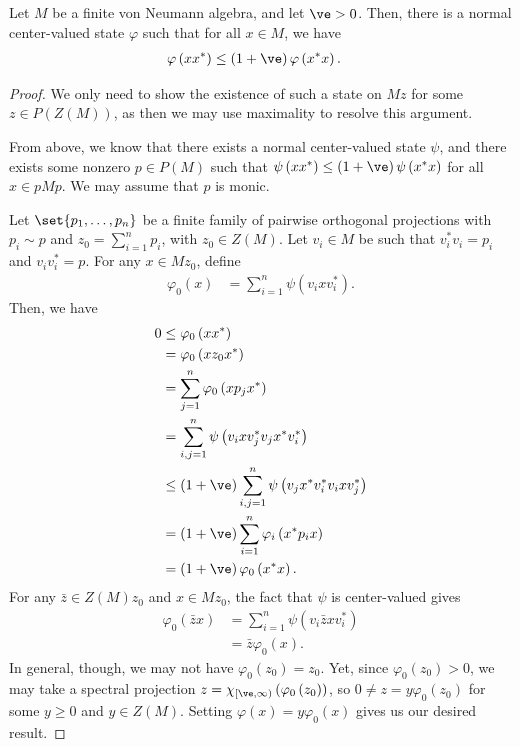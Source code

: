 \documentclass[10pt]{mypackage}
\begin{document}
\begin{lemma}
  Let $M$ be a finite von Neumann algebra, and let $\ve > 0$. Then, there is a normal center-valued state $\varphi$ such that for all $x\in M$, we have
  \begin{align*}
    \varphi\left( xx^{\ast} \right) &\leq \left( 1+\ve \right)\varphi\left( x^{\ast}x \right).
  \end{align*}
\end{lemma}
\begin{proof}
  We only need to show the existence of such a state on $Mz$ for some $z\in P(Z(M))$, as then we may use maximality to resolve this argument.

  From above, we know that there exists a normal center-valued state $\psi$, and there exists some nonzero $p\in P(M)$ such that $\psi\left( xx^{\ast} \right)\leq \left( 1+\ve \right)\psi\left( x^{\ast}x \right)$ for all $x\in pMp$. We may assume that $p$ is monic.

  Let $\set{p_1,\dots,p_n}$ be a finite family of pairwise orthogonal projections with $p_i\sim p$ and $z_0 = \sum_{i=1}^{n}p_i$, with $z_0\in Z(M)$. Let $v_i\in M$ be such that $v_i^{\ast}v_i = p_i$ and $v_iv_i^{\ast} = p$. For any $x\in Mz_0$, define
  \begin{align*}
    \varphi_0(x) &= \sum_{i=1}^{n}\psi\left( v_ixv_i^{\ast} \right).
  \end{align*}
  Then, we have
  \begin{align*}
    0 &\leq \varphi_0\left( xx^{\ast} \right)\\
      &= \varphi_0\left( xz_0x^{\ast} \right)\\
      &= \sum_{j=1}^{n} \varphi_0\left( xp_jx^{\ast} \right)\\
      &= \sum_{i,j=1}^{n} \psi\left( v_ixv_j^{\ast}v_jx^{\ast}v_i^{\ast} \right)\\
      &\leq \left( 1+\ve \right) \sum_{i,j=1}^{n}\psi\left( v_jx^{\ast}v_i^{\ast}v_ixv_j^{\ast} \right)\\
      &= \left( 1+\ve \right)\sum_{i=1}^{n} \varphi_i\left( x^{\ast}p_ix \right)\\
      &= \left( 1+\ve \right)\varphi_0\left( x^{\ast}x \right).
  \end{align*}
  For any $ \bar{z}\in Z(M)z_0 $ and $x\in Mz_0$, the fact that $\psi$ is center-valued gives
  \begin{align*}
    \varphi_0\left( \bar{z}x \right) &= \sum_{i=1}^{n}\psi\left( v_i\bar{z}xv_i^{\ast} \right)\\
                                     &= \bar{z} \varphi_0\left( x \right).
  \end{align*}
  In general, though, we may not have $\varphi_0\left( z_0 \right) = z_0$. Yet, since $\varphi_0\left( z_0 \right) > 0$, we may take a spectral projection $z = \chi_{[\ve,\infty)}\left( \varphi_0\left( z_0 \right) \right)$, so $0 \neq z = y\varphi_0\left( z_0 \right)$ for some $y\geq 0$ and $y\in Z(M)$. Setting $\varphi(x) = y\varphi_0(x)$ gives us our desired result.
\end{proof}
\end{document}
